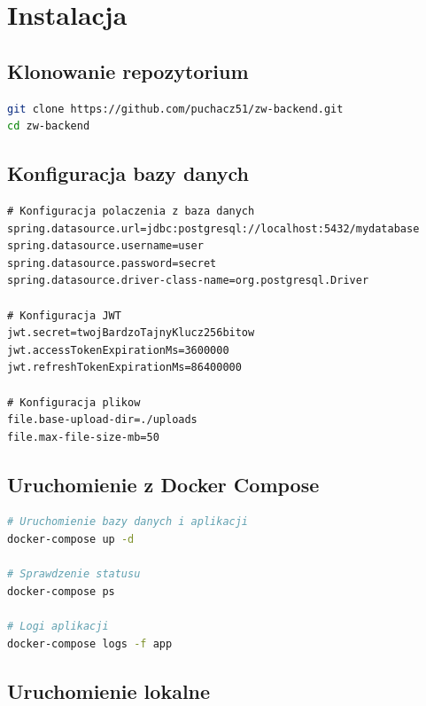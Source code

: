 \documentclass[12pt,a4paper]{report}
\begin{document}
\section{Instalacja}

\subsection{Klonowanie repozytorium}

\begin{lstlisting}[language=bash, caption={Klonowanie projektu}]
git clone https://github.com/puchacz51/zw-backend.git
cd zw-backend
\end{lstlisting}

\subsection{Konfiguracja bazy danych}

\begin{lstlisting}[style=propstyle, caption={application.properties}]
# Konfiguracja polaczenia z baza danych
spring.datasource.url=jdbc:postgresql://localhost:5432/mydatabase
spring.datasource.username=user
spring.datasource.password=secret
spring.datasource.driver-class-name=org.postgresql.Driver

# Konfiguracja JWT
jwt.secret=twojBardzoTajnyKlucz256bitow
jwt.accessTokenExpirationMs=3600000
jwt.refreshTokenExpirationMs=86400000

# Konfiguracja plikow
file.base-upload-dir=./uploads
file.max-file-size-mb=50
\end{lstlisting}

\subsection{Uruchomienie z Docker Compose}

\begin{lstlisting}[language=bash, caption={Uruchomienie z Docker}]
# Uruchomienie bazy danych i aplikacji
docker-compose up -d

# Sprawdzenie statusu
docker-compose ps

# Logi aplikacji
docker-compose logs -f app
\end{lstlisting}

\subsection{Uruchomienie lokalne}
\end{document}

